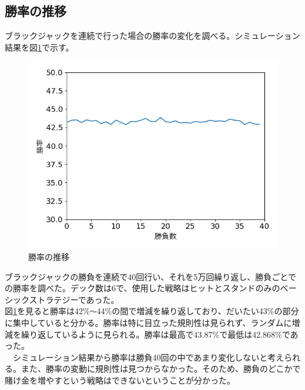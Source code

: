 \subsection{勝率の推移}
ブラックジャックを連続で行った場合の勝率の変化を調べる。シミュレーション結果を図\ref{win}で示す。
\begin{figure}[H]
 \begin{center} 
  \includegraphics[width=0.7\linewidth]{./figure/betsimulation-win}
  \caption{勝率の推移\label{win}}
 \end{center}
\end{figure}
ブラックジャックの勝負を連続で40回行い、それを5万回繰り返し、勝負ごとでの勝率を調べた。デック数は6で、使用した戦略はヒットとスタンドのみのベーシックストラテジーであった。\\
図\ref{win}を見ると勝率は42\%\verb|～|44\%の間で増減を繰り返しており、だいたい43\%の部分に集中していると分かる。勝率は特に目立った規則性は見られず、ランダムに増減を繰り返しているように見られる。勝率は最高で43.87\%で最低は42.868\%であった。\\
　シミュレーション結果から勝率は勝負40回の中であまり変化しないと考えられる。また、勝率の変動に規則性は見つからなかった。そのため、勝負のどこかで賭け金を増やすという戦略はできないということが分かった。

